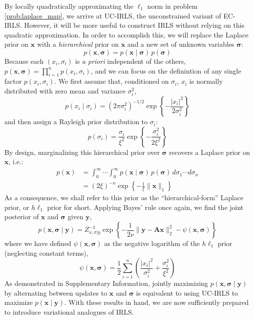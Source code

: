 \documentclass[final,5p,times,twocolumn]{elsarticle}
\newcommand{\m}[1]{\boldsymbol{#1}}
\begin{document}
By locally quadratically approximating the $\ell_1$ norm in problem
\eqref{prob:laplace_map}, we arrive at UC-IRLS, the unconstrained variant
of EC-IRLS. However, it will be more useful to construct IRLS without
relying on this quadratic approximation. In order to accomplish this,
we will replace the Laplace prior on $\m{x}$ with a \emph{hierarchical}
prior on $\m{x}$ and a new set of unknown variables $\m{\sigma}$:
\begin{equation}
p(\m{x}, \m{\sigma}) = p(\m{x} \mid \m{\sigma}) \, p(\m{\sigma})
\label{eq:hprior}
\end{equation}
Because each $(x_i, \sigma_i)$ is \emph{a priori} independent of the
others, $p(\m{x}, \m{\sigma}) = \prod_{i=1}^n p(x_i, \sigma_i)$, and
we can focus on the definintion of any single factor $p(x_i, \sigma_i)$.
We first assume that, conditioned on $\sigma_i$, $x_i$ is normally
distributed with zero mean and variance $\sigma_i^2$,
\begin{equation}
p(x_i \mid \sigma_i) =
 (2 \pi \sigma_i^2)^{-1/2} \exp\left\{
  -\frac{|x_i|^2}{2 \sigma_i^2}
 \right\}
\label{eq:hier_x}
\end{equation}
and then assign a Rayleigh prior distribution to $\sigma_i$:
\begin{equation}
p(\sigma_i) =
 \frac{\sigma_i}{\xi^2} \exp\left\{
  -\frac{\sigma_i^2}{2 \xi^2}
 \right\}
\label{eq:hier_sigma}
\end{equation}
By design, marginalizing this hierarchical prior over $\m{\sigma}$ recovers
a Laplace prior on $\m{x}$, i.e.:
\begin{equation}
\begin{aligned}
p(\m{x}) &=
 \int_0^\infty \cdots \int_0^\infty
 p(\m{x} \mid \m{\sigma}) \, p(\m{\sigma}) \,
 d\sigma_1 \cdots d\sigma_n
\\ &=
 (2 \xi)^{-n} \exp\left\{ -\frac{1}{\xi} \|\m{x}\|_1 \right\}
\end{aligned}
\label{eq:hier_marginal}
\end{equation}
As a consequence, we shall refer to this prior as the ``hierarchical-form''
Laplace prior, or $h\ell_1$ prior for short. Applying Bayes' rule once
again, we find the joint posterior of $\m{x}$ and $\m{\sigma}$ given
$\m{y}$,
\begin{equation}
p(\m{x}, \m{\sigma} \mid \m{y}) =
 Z_{x,\sigma|y}^{-1} \exp\left\{
  -\frac{1}{2 \nu} \| \m{y} - \m{A} \m{x} \|_2^2
  -\psi(\m{x}, \m{\sigma})
 \right\}
\label{eq:hier_post}
\end{equation}
where we have defined $\psi(\m{x}, \m{\sigma})$ as the negative logarithm
of the $h\ell_1$ prior (neglecting constant terms),
\begin{equation}
\psi(\m{x}, \m{\sigma}) =
 \frac{1}{2} \sum_{i=1}^n \left(
  \frac{|x_i|^2}{\sigma_i^2} +
  \frac{\sigma_i^2}{\xi^2}
 \right)
\label{eq:psi}
\end{equation}
As demonstrated in Supplementary Information, jointly maximizing
$p(\m{x}, \m{\sigma} \mid \m{y})$ by alternating between updates to
$\m{x}$ and $\m{\sigma}$ is equivalent to using UC-IRLS to maximize
$p(\m{x} \mid \m{y})$. With these results in hand, we are now sufficiently
prepared to introduce variational analogues of IRLS.
\end{document}
